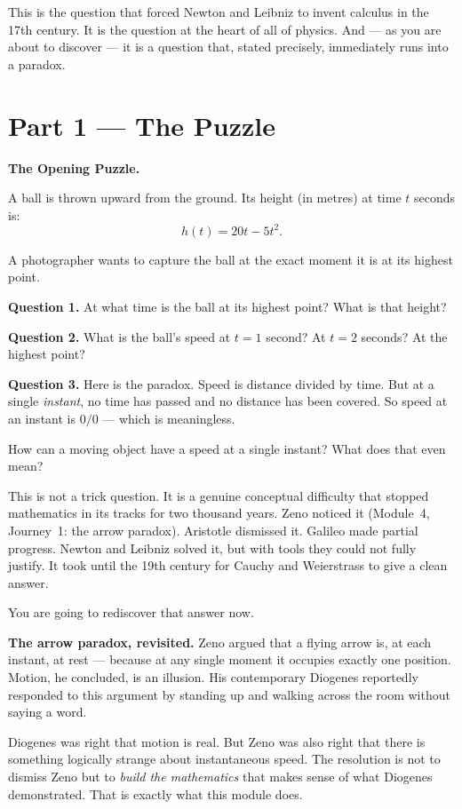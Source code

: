 \documentclass[12pt, a4paper]{article}
\begin{document}
\medskip
This is the question that forced Newton and Leibniz to invent calculus in the 17th century. It is the question at the heart of all of physics. And --- as you are about to discover --- it is a question that, stated precisely, immediately runs into a paradox.

\newpage

\section{Part 1 \texorpdfstring{---}{--} The Puzzle}

\begin{puzzlebox}
\textbf{The Opening Puzzle.}

A ball is thrown upward from the ground. Its height (in metres) at time $t$ seconds is:
\[
  h(t) = 20t - 5t^2.
\]

A photographer wants to capture the ball at the exact moment it is at its highest point.

\medskip
\textbf{Question 1.} At what time is the ball at its highest point? What is that height?

\textbf{Question 2.} What is the ball's speed at $t = 1$ second? At $t = 2$ seconds? At the highest point?

\textbf{Question 3.} Here is the paradox. Speed is distance divided by time. But at a single \emph{instant}, no time has passed and no distance has been covered. So speed at an instant is $0/0$ --- which is meaningless.

How can a moving object have a speed at a single instant? What does that even mean?
\end{puzzlebox}

\medskip
This is not a trick question. It is a genuine conceptual difficulty that stopped mathematics in its tracks for two thousand years. Zeno noticed it (Module~4, Journey~1: the arrow paradox). Aristotle dismissed it. Galileo made partial progress. Newton and Leibniz solved it, but with tools they could not fully justify. It took until the 19th century for Cauchy and Weierstrass to give a clean answer.

You are going to rediscover that answer now.

\begin{thought}
\textbf{The arrow paradox, revisited.}
Zeno argued that a flying arrow is, at each instant, at rest --- because at any single moment it occupies exactly one position. Motion, he concluded, is an illusion. His contemporary Diogenes reportedly responded to this argument by standing up and walking across the room without saying a word.

Diogenes was right that motion is real. But Zeno was also right that there is something logically strange about instantaneous speed. The resolution is not to dismiss Zeno but to \emph{build the mathematics} that makes sense of what Diogenes demonstrated. That is exactly what this module does.
\end{thought}
\end{document}
